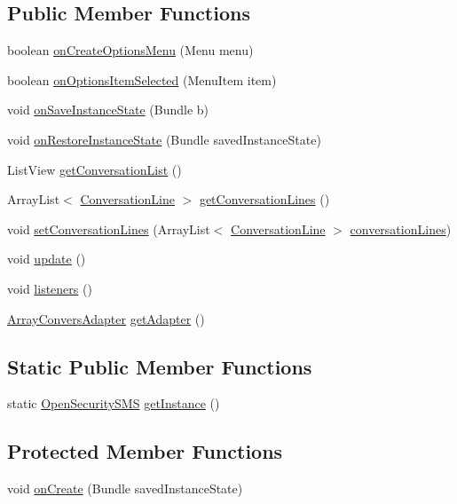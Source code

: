 \subsection*{Public Member Functions}
\begin{DoxyCompactItemize}
\item 
boolean \hyperlink{a00010_a8f7d87763ddaf085205a54e8477ecfce}{on\+Create\+Options\+Menu} (Menu menu)
\item 
boolean \hyperlink{a00010_a37a55c533c74b60c0290ef1329d74e65}{on\+Options\+Item\+Selected} (Menu\+Item item)
\item 
void \hyperlink{a00010_aa2cebeeaec1e0ca5b7bdec2ccfd24252}{on\+Save\+Instance\+State} (Bundle b)
\item 
void \hyperlink{a00010_a3fd108ef7b3bf7c29e53e6c4984d5f84}{on\+Restore\+Instance\+State} (Bundle saved\+Instance\+State)
\item 
List\+View \hyperlink{a00010_a75e7cb8078fb5fdb58b09524fdd9e1d7}{get\+Conversation\+List} ()
\item 
Array\+List$<$ \hyperlink{a00009}{Conversation\+Line} $>$ \hyperlink{a00010_a65bc274b44a44cb00ba767e86e50ee83}{get\+Conversation\+Lines} ()
\item 
void \hyperlink{a00010_a75b300477b934b09cac51aaa4c96b245}{set\+Conversation\+Lines} (Array\+List$<$ \hyperlink{a00009}{Conversation\+Line} $>$ \hyperlink{a00010_aa533b62d6a728d5400683c4d6c0d8334}{conversation\+Lines})
\item 
void \hyperlink{a00010_ac5c54df7ed3b930268c8d7752c101725}{update} ()
\item 
void \hyperlink{a00010_a92b8e0730130e1184a8cdbd89590779d}{listeners} ()
\item 
\hyperlink{a00003}{Array\+Convers\+Adapter} \hyperlink{a00010_ab5e43d47bbe04b3b6a4561d91bc16f9f}{get\+Adapter} ()
\end{DoxyCompactItemize}
\subsection*{Static Public Member Functions}
\begin{DoxyCompactItemize}
\item 
static \hyperlink{a00010}{Open\+Security\+S\+M\+S} \hyperlink{a00010_a20b99dca6a5147ea92b68f8ce333dc2e}{get\+Instance} ()
\end{DoxyCompactItemize}
\subsection*{Protected Member Functions}
\begin{DoxyCompactItemize}
\item 
void \hyperlink{a00010_a85e87cb5ced88dff7c8173ecc4f636d1}{on\+Create} (Bundle saved\+Instance\+State)
\end{DoxyCompactItemize}
